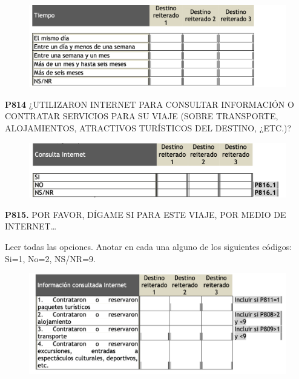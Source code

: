 \documentclass[
  openany]{book}
\begin{document}
\begin{figure}

{\centering \includegraphics[width=1\linewidth]{imagenes/figura6-268} 

}

\end{figure}

\textbf{P814} ¿UTILIZARON INTERNET PARA CONSULTAR INFORMACIÓN O CONTRATAR SERVICIOS PARA SU VIAJE (SOBRE TRANSPORTE, ALOJAMIENTOS, ATRACTIVOS TURÍSTICOS DEL DESTINO, ¿ETC.)?

\begin{figure}

{\centering \includegraphics[width=1\linewidth]{imagenes/figura6-269} 

}

\end{figure}

\textbf{P815.} POR FAVOR, DÍGAME SI PARA ESTE VIAJE, POR MEDIO DE INTERNET\ldots{}

Leer todas las opciones. Anotar en cada una alguno de los siguientes códigos: Si=1, No=2, NS/NR=9.

\begin{figure}

{\centering \includegraphics[width=1\linewidth]{imagenes/figura6-270} 

}

\end{figure}
\end{document}
